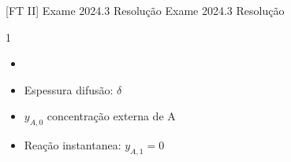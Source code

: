 \documentclass[\mainfilename]{subfiles}
\begin{document}

[FT II]
{Exame 2024.3 Resolução} %
{Exame 2024.3 Resolução} %

\begin{questionBox}1{ %
    \begin{itemize}
        \item {}
        \item Espessura difusão: \(\delta\)
        \item \(y_{A,0}\) concentração externa de A
        \item Reação instantanea: \(y_{A,1}=0\)
    \end{itemize}
} %
\end{questionBox}
\end{document}
